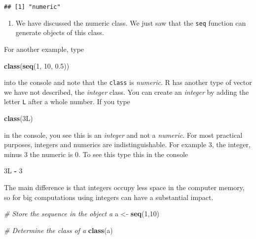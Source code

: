 \documentclass[]{article}
\newenvironment{Shaded}{\begin{snugshade}}{\end{snugshade}}
\newcommand{\CommentTok}[1]{\textcolor[rgb]{0.56,0.35,0.01}{\textit{#1}}}
\newcommand{\DecValTok}[1]{\textcolor[rgb]{0.00,0.00,0.81}{#1}}
\newcommand{\FloatTok}[1]{\textcolor[rgb]{0.00,0.00,0.81}{#1}}
\newcommand{\KeywordTok}[1]{\textcolor[rgb]{0.13,0.29,0.53}{\textbf{#1}}}
\newcommand{\NormalTok}[1]{#1}
\newcommand{\OperatorTok}[1]{\textcolor[rgb]{0.81,0.36,0.00}{\textbf{#1}}}
\newcommand{\StringTok}[1]{\textcolor[rgb]{0.31,0.60,0.02}{#1}}
\providecommand{\tightlist}{%
  \setlength{\itemsep}{0pt}\setlength{\parskip}{0pt}}
\begin{document}
\begin{verbatim}
## [1] "numeric"
\end{verbatim}

\begin{enumerate}
\def\labelenumi{\arabic{enumi}.}
\setcounter{enumi}{9}
\tightlist
\item
  We have discussed the numeric class. We just saw that the \texttt{seq}
  function can generate objects of this class.
\end{enumerate}

For another example, type

\begin{Shaded}
\begin{Highlighting}[]
\KeywordTok{class}\NormalTok{(}\KeywordTok{seq}\NormalTok{(}\DecValTok{1}\NormalTok{, }\DecValTok{10}\NormalTok{, }\FloatTok{0.5}\NormalTok{))}
\end{Highlighting}
\end{Shaded}

into the console and note that the \texttt{class} is \emph{numeric}. R
has another type of vector we have not described, the \emph{integer}
class. You can create an \emph{integer} by adding the letter \texttt{L}
after a whole number. If you type

\begin{Shaded}
\begin{Highlighting}[]
\KeywordTok{class}\NormalTok{(3L)}
\end{Highlighting}
\end{Shaded}

in the console, you see this is an \emph{integer} and not a
\emph{numeric}. For most practical purposes, integers and numerics are
indistinguishable. For example 3, the integer, minus 3 the numeric is 0.
To see this type this in the console

\begin{Shaded}
\begin{Highlighting}[]
\NormalTok{3L }\OperatorTok{-}\StringTok{ }\DecValTok{3}
\end{Highlighting}
\end{Shaded}

The main difference is that integers occupy less space in the computer
memory, so for big computations using integers can have a substantial
impact.

\begin{Shaded}
\begin{Highlighting}[]
\CommentTok{# Store the sequence in the object a}
\NormalTok{a <-}\StringTok{ }\KeywordTok{seq}\NormalTok{(}\DecValTok{1}\NormalTok{,}\DecValTok{10}\NormalTok{)}

\CommentTok{# Determine the class of a}
\KeywordTok{class}\NormalTok{(a)}
\end{Highlighting}
\end{Shaded}
\end{document}
